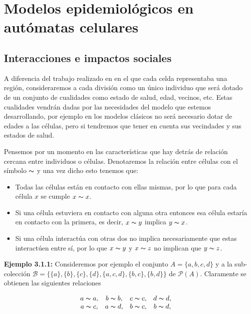 \chapter{Modelos epidemiológicos en autómatas celulares}\label{ch:Modelos epidemiológicos en AC}

\section{Interacciones e impactos sociales}
A diferencia del trabajo realizado en \cite{populationDensity} en el que cada celda representaba una región, consideraremos a cada división como un único individuo que será dotado de un conjunto de cualidades como estado de salud, edad, vecinos, etc. Estas cualidades vendrán dadas por las necesidades del modelo que estemos desarrollando, por ejemplo en los modelos clásicos no será necesario dotar de edades a las células, pero si tendremos que tener en cuenta sus vecindades y sus estados de salud.

Pensemos por un momento en las características que hay detrás de relación cercana entre individuos o células. Denotaremos la relación entre células con el símbolo $\thicksim$ y una vez dicho esto tenemos que:

\begin{itemize}
    \item Todas las células están en contacto con ellas mismas, por lo que para cada célula $x$ se cumple $x \thicksim x$.
    \item Si una célula estuviera en contacto con alguna otra entonces esa célula estaría en contacto con la primera, es decir, $x\thicksim y$ implica $y\thicksim x$.
    \item Si una célula interactúa con otras dos no implica necesariamente que estas interactúen entre sí, por lo que $x\thicksim y$ y $x\thicksim z$ no implican que $y\thicksim z$.
\end{itemize}

 \textbf{Ejemplo 3.1.1:} Consideremos por ejemplo el conjunto $A=\{a,b,c,d\}$ y a la sub-colección $\mathcal{B} = \{\{a\},\{b\},\{c\},\{d\},\{a,c,d\}, \{b,c\}, \{b,d\}\}$ de $\mathcal{P}(A)$. Claramente se obtienen las siguientes relaciones

$$\begin{array}{cccc}
    a\thicksim a, & b\thicksim b, & c\thicksim c, & d\thicksim d, \\ 
    a\thicksim c, & a\thicksim d, & b\thicksim c, & b\thicksim d,
\end{array}$$

